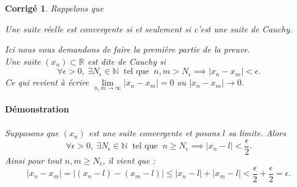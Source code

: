 \documentclass[11pt,french,table]{article}
\theoremstyle{exercice}
\theoremstyle{corrigé}
\newtheorem{corrigé}{Corrigé}
\begin{document}
\vspace{1em}
\begin{corrigé}
Rappelons que 
    \begin{center}\textit{Une suite réelle est convergente si et seulement si c’est une suite de Cauchy.}
    \end{center}
    Ici nous vous demandons de faire la première partie de la preuve. \\
    Une suite $(x_n)\subset \mathbb{R}$ est dite de Cauchy si 
    \begin{equation*}
        \forall \epsilon>0, \ \exists N_\epsilon\in \mathbb{N} \  \text{ tel que } \  n,m>N_\epsilon \implies |x_n-x_m|<\epsilon. 
    \end{equation*}
    Ce qui revient à écrire $\lim\limits_{n,m\to \infty}{|x_n-x_m|}=0$ ou $|x_n-x_m|\to 0$. 
      \paragraph{Démonstration}
   
\paragraph{}
Supposons que $(x_n)$ est une suite convergente et posons $l$ sa limite. Alors 
\begin{equation*}
    \forall \epsilon >0, \ \exists N_\epsilon \in \mathbb{N} \ \text{ tel que } \ n\geq N_\epsilon \implies |x_n-l|<\frac{\epsilon}{2}. 
\end{equation*}
Ainsi pour tout $n,m\geq N_\epsilon$, il vient que : \begin{equation*}
    |x_n-x_m|=|(x_n-l)-(x_m-l)|\leq |x_n-l|+|x_m-l|<\frac{\epsilon}{2}+\frac{\epsilon}{2}=\epsilon. 
\end{equation*}
\end{corrigé}
\vspace{1em}
\end{document}
